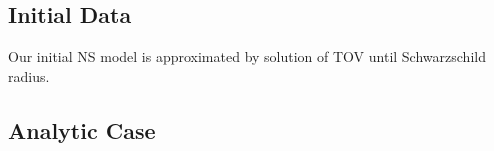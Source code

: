 \documentclass[prd]{revtex4}
\newcommand*\apost{\textsc{\char13}}
\begin{document}






\subsection{Initial Data}
Our initial NS model is approximated by solution of TOV until Schwarzschild radius.

\subsection{Analytic Case}
\end{document}
